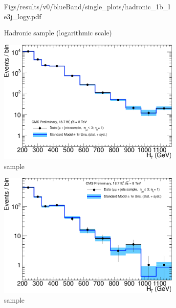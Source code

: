 \begin{figure}[h!]
\begin{subfigure}[b]{0.48\textwidth}
    {Figs/results/v0/blueBand/single_plots/hadronic_1b_le3j_logy.pdf}
    \caption{Hadronic sample (logarithmic scale)}
  \end{subfigure}
  \begin{subfigure}[b]{0.48\textwidth}
    \includegraphics[width=\textwidth]
    {Figs/results/v0/blueBand/single_plots/muon_1b_le3j_logy.pdf}
    \caption{\mj sample}
  \end{subfigure}
  \begin{subfigure}[b]{0.48\textwidth}
    \includegraphics[width=\textwidth]
    {Figs/results/v0/blueBand/single_plots/mumu_1b_le3j_logy.pdf}
    \caption{\mmj sample}
  \end{subfigure}\\
  \vspace{0.7cm}\begin{subfigure}[b]{0.48\textwidth}

\end{subfigure}
\end{figure}
